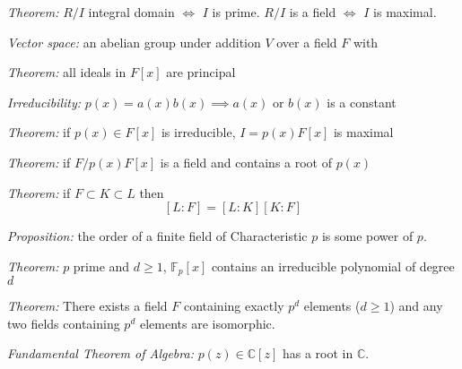 \documentclass[9pt]{memoir}
\newcommand{\C}{\mathbb{C}}
\begin{document}
\begin{multicols}{2}
    \emph{Theorem:} $R/I$ integral domain $\iff$ $I$ is prime. $R/I$ is a field $\iff$ $I$ is maximal. 

    \emph{Vector space:} an abelian group under addition $V$ over a field $F$ with 

    \emph{Theorem:} all ideals in $F[x]$ are principal 

    \emph{Irreducibility:} $p(x)= a(x)b(x) \implies a(x)$ or $b(x)$ is a constant  

    \emph{Theorem:} if $p(x) \in F[x]$ is irreducible, $I = p(x)F[x]$ is maximal 

    \emph{Theorem:} if $F/p(x)F[x]$ is a field and contains a root of $p(x)$ 

    \emph{Theorem:} if $F \subset K \subset L$ then 
    \[[L : F] = [L:K][K:F]\]

    \emph{Proposition:} the order of a finite field of Characteristic $p$ is some power of $p$.

    \emph{Theorem:} $p$ prime and $d \geq 1$, $\mathbb{F}_p[x]$ contains an irreducible polynomial of degree $d$ 

    \emph{Theorem:} There exists a field $F$ containing exactly $p^d$ elements ($d\geq 1$) and any two fields containing $p^d$ elements are isomorphic.

    \emph{Fundamental Theorem of Algebra:} $p(z) \in \C[z]$ has a root in $\C$.

\end{multicols}
\end{document}
